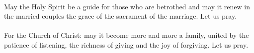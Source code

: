 \Assembly{\answerforprayers}\\

May the Holy Spirit be a guide for those who are betrothed
and may it renew in the married couples the grace of the sacrament
of the marriage. Let us pray.\\

\Assembly{\answerforprayers}\\

For the Church of Christ: may it become more and more a family,
united by the patience of listening,
the richness of giving and the joy of forgiving. Let us pray.\\

\Assembly{\answerforprayers}\\


